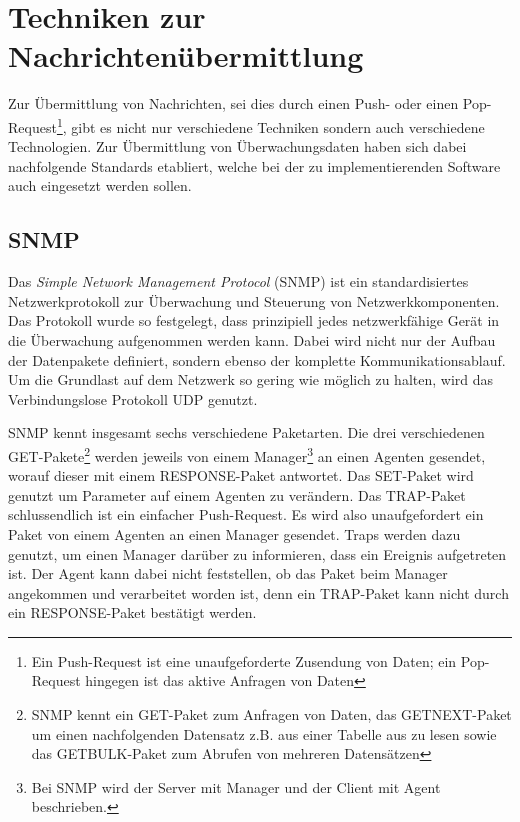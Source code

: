\section{Techniken zur Nachrichten\"ubermittlung} \label{sec:theorie-msg}
Zur \"Ubermittlung von Nachrichten, sei dies durch einen Push- oder einen Pop-Request\footnote{\label{foot:push-pop}Ein Push-Request ist eine unaufgeforderte Zusendung von Daten; ein Pop-Request hingegen ist das aktive Anfragen von Daten}, gibt es nicht nur verschiedene Techniken sondern auch verschiedene Technologien. Zur \"Ubermittlung von \"Uberwachungsdaten haben sich dabei nachfolgende Standards etabliert, welche bei der zu implementierenden Software auch eingesetzt werden sollen.

\subsection{SNMP} \label{sec:theorie-snmp}
Das \textit{Simple Network Management Protocol} (SNMP) ist ein standardisiertes Netzwerkprotokoll zur \"Uberwachung und Steuerung von Netzwerkkomponenten. Das Protokoll wurde so festgelegt, dass prinzipiell jedes netzwerkf\"ahige Ger\"at in die \"Uberwachung aufgenommen werden kann. Dabei wird nicht nur der Aufbau der Datenpakete definiert, sondern ebenso der komplette Kommunikationsablauf. Um die Grundlast auf dem Netzwerk so gering wie m\"oglich zu halten, wird das Verbindungslose Protokoll UDP genutzt.

SNMP kennt insgesamt sechs verschiedene Paketarten. Die drei verschiedenen GET-Pakete\footnote{\label{foot:snmp-get-pkgs}SNMP kennt ein GET-Paket zum Anfragen von Daten, das GETNEXT-Paket um einen nachfolgenden Datensatz z.B. aus einer Tabelle aus zu lesen sowie das GETBULK-Paket zum Abrufen von mehreren Datens\"atzen} werden jeweils von einem Manager\footnote{Bei SNMP wird der Server mit Manager und der Client mit Agent beschrieben.} an einen Agenten gesendet, worauf dieser mit einem RESPONSE-Paket antwortet. Das SET-Paket wird genutzt um Parameter auf einem Agenten zu ver\"andern. Das TRAP-Paket schlussendlich ist ein einfacher Push-Request. Es wird also unaufgefordert ein Paket von einem Agenten an einen Manager gesendet. Traps werden dazu genutzt, um einen Manager dar\"uber zu informieren, dass ein Ereignis aufgetreten ist. Der Agent kann dabei nicht feststellen, ob das Paket beim Manager angekommen und verarbeitet worden ist, denn ein TRAP-Paket kann nicht durch ein RESPONSE-Paket best\"atigt werden.


